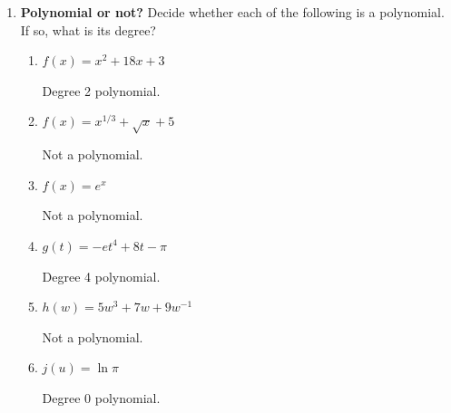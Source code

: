 \documentclass{article}
\begin{document}
\begin{enumerate}
\item  \textbf{Polynomial or not?}  Decide whether each of the following is
  a polynomial.  If so, what is its degree?
    \begin{enumerate}
    \item
      \begin{problem}
        $f(x) = x^2 + 18x + 3$
      \end{problem}

      \begin{solution}
         Degree 2 polynomial.
      \end{solution}

    \item
      \begin{problem}
        $f(x) = x^{1/3} + \sqrt{x} + 5$
      \end{problem}

      \begin{solution}
        Not a polynomial.
      \end{solution}

    \item
      \begin{problem}
        $f(x) = e^x$
      \end{problem}

      \begin{solution}
        Not a polynomial.
      \end{solution}

    \item
      \begin{problem}
        $g(t) = -e t^4 + 8t - \pi$
      \end{problem}

      \begin{solution}
        Degree 4 polynomial.
      \end{solution}

    \item
      \begin{problem}
        $h(w) = 5w^3 + 7w + 9 w^{-1}$
      \end{problem}

      \begin{solution}
        Not a polynomial.
      \end{solution}

    \item
      \begin{problem}
        $j(u) = \ln \pi$
      \end{problem}

      \begin{solution}
        Degree 0 polynomial.
      \end{solution}
    \end{enumerate}

  \probonly{\end{multicols}}

\end{enumerate}
\end{document}
